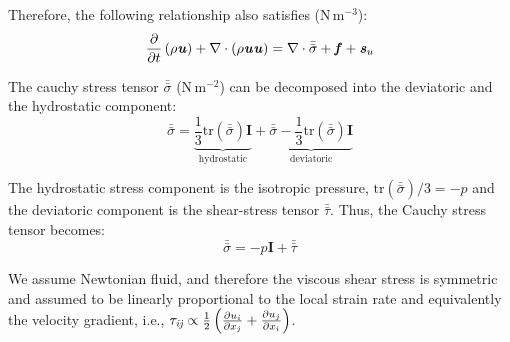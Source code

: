 Therefore, the following relationship also satisfies (N\,m$^{-3}$):
\begin{equation}
\frac{\partial}{\partial t} \left(\rho \textbf{\textit{u}} \right) + \nabla \cdot \left(\rho \textbf{\textit{u}}\textbf{\textit{u}} \right) = \nabla \cdot \bar{\bar{{\sigma}}} +  \textbf{\textit{f}} +  \textbf{\textit{s}}_{u}
\end{equation}

The cauchy stress tensor $\bar{\bar{{\sigma}}}$ (N\,m$^{-2}$) can be decomposed into the deviatoric and the hydrostatic component:
\begin{equation}
\bar{\bar{{\sigma}}} =  \underbrace{ \frac{1}{3}\mathrm{tr}\left(\bar{\bar{{\sigma}}}\right) \textbf{I} }_\text{hydrostatic}  + \underbrace{ \bar{\bar{{\sigma}}} - \frac{1}{3}\mathrm{tr}\left(\bar{\bar{{\sigma}}} \right)\textbf{I} }_\text{deviatoric}
\end{equation}

The hydrostatic stress component is the isotropic pressure, $\mathrm{tr}\left(\bar{\bar{{\sigma}}} \right)/3 = -p$ and the deviatoric component is the shear-stress tensor $\bar{\bar{{\tau}}}$. Thus, the Cauchy stress tensor becomes:
\begin{equation}
\bar{\bar{\sigma}} = -p\textbf{I} + \bar{\bar{{\tau}}}
\end{equation}

\begin{assumption}
	We assume Newtonian fluid, and therefore the viscous shear stress is symmetric and assumed to be linearly proportional to the local strain rate and equivalently the velocity gradient, i.e., $\tau_{\textit{ij}} \propto \frac{1}{2}\left(\frac{\partial u_i}{\partial x_j} + \frac{\partial u_j}{\partial x_i}\right)$.
\end{assumption}

